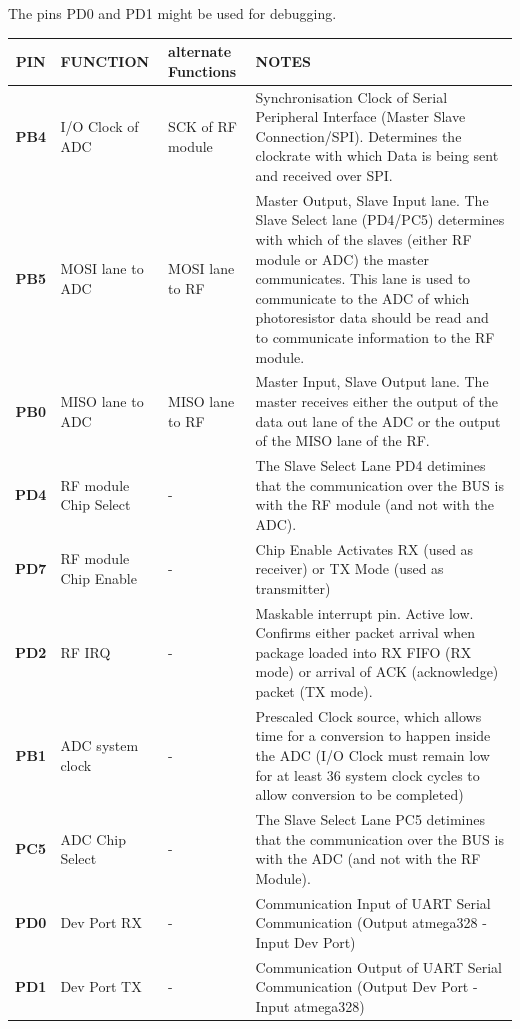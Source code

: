 \documentclass[12pt]{article}
\begin{document}
The pins PD0 and PD1 might be used for debugging.

\small
\begin{tabular}{| c || p{30mm} | p{30mm} | p{60mm} |}
  \hline
  \textbf{PIN} & FUNCTION & alternate Functions & NOTES\\
  \hline
  \hline
  \textbf{PB4} & I/O Clock of ADC & SCK of RF module & Synchronisation Clock of Serial Peripheral Interface (Master Slave Connection/SPI). Determines the clockrate with which Data is being sent and received over SPI.\\
  \hline
  \textbf{PB5} & MOSI lane to ADC & MOSI lane to RF & Master Output, Slave Input lane. The Slave Select lane (PD4/PC5) determines with which of the slaves (either RF module or ADC) the master communicates. This lane is used to communicate to the ADC of which photoresistor data should be read and to communicate information to the RF module.\\
  \hline
  \textbf{PB0} & MISO lane to ADC & MISO lane to RF & Master Input, Slave Output lane. The master receives either the output of the data out lane of the ADC or the output of the MISO lane of the RF.\\
  \hline
  \textbf{PD4} & RF module Chip Select & - & The Slave Select Lane PD4 detimines that the communication over the BUS is with the RF module (and not with the ADC).\\
  \hline
  \textbf{PD7} & RF module Chip Enable & - & Chip Enable Activates RX (used as receiver) or TX Mode (used as transmitter)\\
  \hline
  \textbf{PD2} & RF IRQ & - & Maskable interrupt pin. Active low. Confirms either packet arrival when package loaded into RX FIFO (RX mode) or arrival of ACK (acknowledge) packet (TX mode).\\
  \hline
  \textbf{PB1} & ADC system clock & - & Prescaled Clock source, which allows time for a conversion to happen inside the ADC (I/O Clock must remain low for at least 36 system clock cycles to allow conversion to be completed)\\
  \hline
  \textbf{PC5} & ADC Chip Select & - & The Slave Select Lane PC5 detimines that the communication over the BUS is with the ADC (and not with the RF Module).\\
  \hline
  \textbf{PD0} & Dev Port RX & - & Communication Input of UART Serial Communication (Output atmega328 - Input Dev Port)\\
  \hline
  \textbf{PD1} & Dev Port TX & - & Communication Output of UART Serial Communication (Output Dev Port - Input atmega328)\\
  \hline
\end{tabular}
\normalsize
\end{document}
